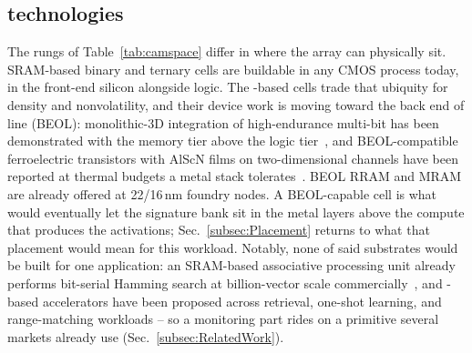 \subsection{\cam technologies}
\label{subsec:CAMtech}
The rungs of Table~\ref{tab:camspace} differ in where the array can
physically sit. SRAM-based binary and ternary cells are buildable in
any CMOS process today, in the front-end silicon alongside logic. The
\fefet-based cells trade that ubiquity for density and nonvolatility,
and their device work is moving toward the back end of line (BEOL):
monolithic-3D integration of high-endurance multi-bit \fefets has been
demonstrated with the memory tier above the logic
tier~\cite{dutta2020m3dfefet}, and BEOL-compatible ferroelectric
transistors with AlScN films on two-dimensional channels have been
reported at thermal budgets a metal stack tolerates~\cite{kim2023alscn}.
BEOL RRAM and MRAM are already offered at 22/16\,nm foundry nodes. A
BEOL-capable cell is what would eventually let the signature bank sit
in the metal layers above the compute that produces the activations;
Sec.~\ref{subsec:Placement} returns to what that placement would mean
for this workload. Notably, none of said substrates would be built
for one application: an SRAM-based associative processing unit
already performs bit-serial Hamming search at billion-vector
scale commercially~\cite{gsi2025apu}, and \cam-based accelerators
have been proposed across retrieval, one-shot learning, and
range-matching workloads -- so a monitoring part rides on a
primitive several markets already use
(Sec.~\ref{subsec:RelatedWork}).

